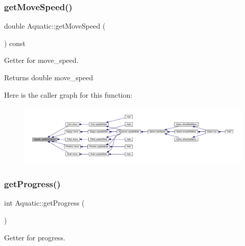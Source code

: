 \subsubsection{\texorpdfstring{get\+Move\+Speed()}{getMoveSpeed()}}
{\footnotesize\ttfamily double Aquatic\+::get\+Move\+Speed (\begin{DoxyParamCaption}{ }\end{DoxyParamCaption}) const}



Getter for move\+\_\+speed. 

\begin{DoxyReturn}{Returns}
double move\+\_\+speed 
\end{DoxyReturn}
Here is the caller graph for this function\+:
\nopagebreak
\begin{figure}[H]
\begin{center}
\leavevmode
\includegraphics[width=350pt]{class_aquatic_a4153178bfefdc57cbcd05fe44054dac9_icgraph}
\end{center}
\end{figure}
\mbox{\label{class_aquatic_a0de76e489d82ccad52dec32a1978850c}} 
\subsubsection{\texorpdfstring{get\+Progress()}{getProgress()}}
{\footnotesize\ttfamily int Aquatic\+::get\+Progress (\begin{DoxyParamCaption}{ }\end{DoxyParamCaption})}



Getter for progress. 

